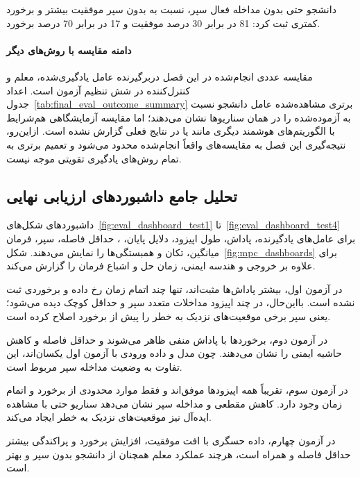 دانشجو حتی بدون مداخله فعال سپر، نسبت به  بدون سپر موفقیت بیشتر و برخورد کمتری ثبت کرد: 81 در برابر 30 درصد موفقیت و 17 در برابر 70 درصد برخورد.

\paragraph{دامنه مقایسه با روش‌های دیگر}
مقایسه عددی انجام‌شده در این فصل دربرگیرنده عامل یادگیری‌شده، معلم و کنترل‌کننده  در شش تنظیم آزمون است. اعداد جدول~\ref{tab:final_eval_outcome_summary} برتری مشاهده‌شده عامل دانشجو نسبت به  آزموده‌شده را در همان سناریوها نشان می‌دهند؛ اما مقایسه آزمایشگاهی هم‌شرایط با الگوریتم‌های هوشمند دیگری مانند  یا  در نتایج فعلی گزارش نشده است. ازاین‌رو، نتیجه‌گیری این فصل به مقایسه‌های واقعاً انجام‌شده محدود می‌شود و تعمیم برتری به تمام روش‌های یادگیری تقویتی موجه نیست.

\subsection{تحلیل جامع داشبوردهای ارزیابی نهایی}
\label{subsec:final_eval_dashboard_analysis}

داشبوردهای شکل‌های~\ref{fig:eval_dashboard_test1} تا~\ref{fig:eval_dashboard_test4} برای عامل‌های یادگیرنده، پاداش، طول اپیزود، دلایل پایان، ، حداقل فاصله، سپر، فرمان میانگین، تکان و همبستگی‌ها را نمایش می‌دهند. شکل~\ref{fig:mpc_dashboards} برای  علاوه بر خروجی و هندسه ایمنی، زمان حل و اشباع فرمان را گزارش می‌کند.

در آزمون اول، بیشتر پاداش‌ها مثبت‌اند، تنها چند اتمام زمان رخ داده و برخوردی ثبت نشده است. بااین‌حال، در چند اپیزود مداخلات متعدد سپر و حداقل  کوچک دیده می‌شود؛ یعنی سپر برخی موقعیت‌های نزدیک به خطر را پیش از برخورد اصلاح کرده است.

در آزمون دوم، برخوردها با پاداش منفی ظاهر می‌شوند و حداقل فاصله و  کاهش حاشیه ایمنی را نشان می‌دهند. چون مدل و داده ورودی با آزمون اول یکسان‌اند، این تفاوت به وضعیت مداخله سپر مربوط است.

در آزمون سوم، تقریباً همه اپیزودها موفق‌اند و فقط موارد محدودی از برخورد و اتمام زمان وجود دارد. کاهش مقطعی  و مداخله سپر نشان می‌دهد سناریو حتی با مشاهده ایده‌آل نیز موقعیت‌های نزدیک به خطر ایجاد می‌کند.

در آزمون چهارم، داده حسگری با افت موفقیت، افزایش برخورد و پراکندگی بیشتر حداقل فاصله و  همراه است، هرچند عملکرد معلم همچنان از دانشجو بدون سپر و  بهتر است.

